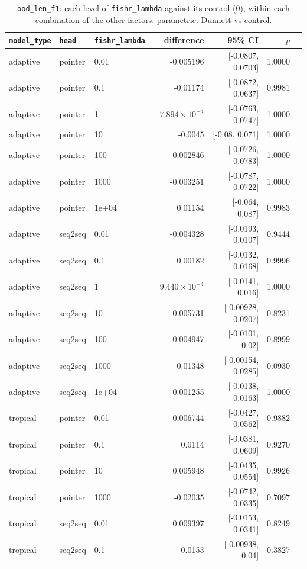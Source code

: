 \documentclass[10pt]{article}
\begin{document}
{\small
\begin{longtable}{lllrrrl}
\caption{\texttt{ood\_len\_f1}: each level of \texttt{fishr\_lambda} against its control (0), within each combination of the other factors. parametric: Dunnett vs control.}\label{tab:control-ood_len_f1}\\
\toprule
\texttt{model\_type} & \texttt{head} & \texttt{fishr\_lambda} & difference & 95\% CI & $p$ & \\
\midrule
\endhead
adaptive & pointer & 0.01 & -0.005196 & [-0.0807, 0.0703] & 1.0000 & \\
adaptive & pointer & 0.1 & -0.01174 & [-0.0872, 0.0637] & 0.9981 & \\
adaptive & pointer & 1 & $-7.894\times10^{-4}$ & [-0.0763, 0.0747] & 1.0000 & \\
adaptive & pointer & 10 & -0.0045 & [-0.08, 0.071] & 1.0000 & \\
adaptive & pointer & 100 & 0.002846 & [-0.0726, 0.0783] & 1.0000 & \\
adaptive & pointer & 1000 & -0.003251 & [-0.0787, 0.0722] & 1.0000 & \\
adaptive & pointer & 1e+04 & 0.01154 & [-0.064, 0.087] & 0.9983 & \\
adaptive & seq2seq & 0.01 & -0.004328 & [-0.0193, 0.0107] & 0.9444 & \\
adaptive & seq2seq & 0.1 & 0.00182 & [-0.0132, 0.0168] & 0.9996 & \\
adaptive & seq2seq & 1 & $9.440\times10^{-4}$ & [-0.0141, 0.016] & 1.0000 & \\
adaptive & seq2seq & 10 & 0.005731 & [-0.00928, 0.0207] & 0.8231 & \\
adaptive & seq2seq & 100 & 0.004947 & [-0.0101, 0.02] & 0.8999 & \\
adaptive & seq2seq & 1000 & 0.01348 & [-0.00154, 0.0285] & 0.0930 & \\
adaptive & seq2seq & 1e+04 & 0.001255 & [-0.0138, 0.0163] & 1.0000 & \\
tropical & pointer & 0.01 & 0.006744 & [-0.0427, 0.0562] & 0.9882 & \\
tropical & pointer & 0.1 & 0.0114 & [-0.0381, 0.0609] & 0.9270 & \\
tropical & pointer & 10 & 0.005948 & [-0.0435, 0.0554] & 0.9926 & \\
tropical & pointer & 1000 & -0.02035 & [-0.0742, 0.0335] & 0.7097 & \\
tropical & seq2seq & 0.01 & 0.009397 & [-0.0153, 0.0341] & 0.8249 & \\
tropical & seq2seq & 0.1 & 0.0153 & [-0.00938, 0.04] & 0.3827 & \\

\end{longtable}}
\end{document}

